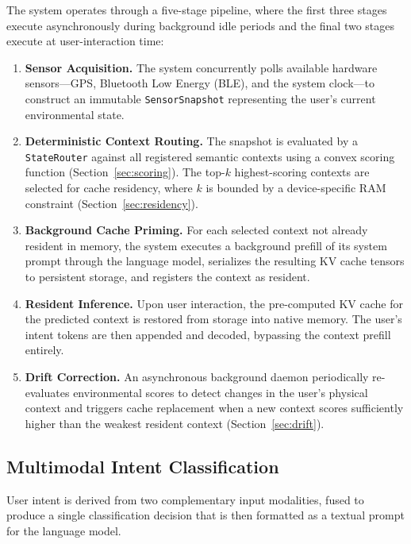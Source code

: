 \documentclass[journal]{IEEEtran}
\begin{document}
The system operates through a five-stage pipeline, where the first three stages execute asynchronously during background idle periods and the final two stages execute at user-interaction time:

\begin{enumerate}
    \item \textbf{Sensor Acquisition.} The system concurrently polls available hardware sensors---GPS, Bluetooth Low Energy (BLE), and the system clock---to construct an immutable \texttt{SensorSnapshot} representing the user's current environmental state.

    \item \textbf{Deterministic Context Routing.} The snapshot is evaluated by a \texttt{StateRouter} against all registered semantic contexts using a convex scoring function (Section~\ref{sec:scoring}). The top-$k$ highest-scoring contexts are selected for cache residency, where $k$ is bounded by a device-specific RAM constraint (Section~\ref{sec:residency}).

    \item \textbf{Background Cache Priming.} For each selected context not already resident in memory, the system executes a background prefill of its system prompt through the language model, serializes the resulting KV cache tensors to persistent storage, and registers the context as resident.

    \item \textbf{Resident Inference.} Upon user interaction, the pre-computed KV cache for the predicted context is restored from storage into native memory. The user's intent tokens are then appended and decoded, bypassing the context prefill entirely.

    \item \textbf{Drift Correction.} An asynchronous background daemon periodically re-evaluates environmental scores to detect changes in the user's physical context and triggers cache replacement when a new context scores sufficiently higher than the weakest resident context (Section~\ref{sec:drift}).
\end{enumerate}

\subsection{Multimodal Intent Classification}
\label{sec:fusion}

User intent is derived from two complementary input modalities, fused to produce a single classification decision that is then formatted as a textual prompt for the language model.
\end{document}
